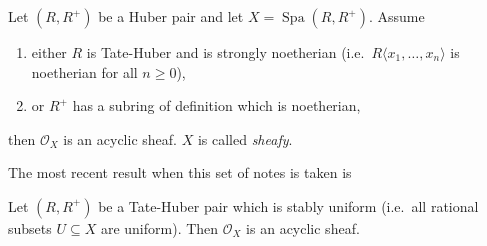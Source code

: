 \documentclass[a4paper]{article}
\newcommand{\sh}[1]{\mathcal{#1}} %
\DeclareMathOperator{\Spa}{Spa}
\begin{document}
\begin{theorem}
  Let \((R, R^+)\) be a Huber pair and let \(X = \Spa(R, R^+)\). Assume
  \begin{enumerate}
  \item either \(R\) is Tate-Huber and is strongly noetherian (i.e.\ \(R\langle x_1, \dots, x_n \rangle\) is noetherian for all \(n \geq 0\)),
  \item or \(R^+\) has a subring of definition which is noetherian,
  \end{enumerate}
  then \(\sh O_X\) is an acyclic sheaf. \(X\) is called \emph{sheafy}.
\end{theorem}

The most recent result when this set of notes is taken is

\begin{theorem}
  Let \((R, R^+)\) be a Tate-Huber pair which is stably uniform (i.e.\ all rational subsets \(U \subseteq X\) are uniform). Then \(\sh O_X\) is an acyclic sheaf.
\end{theorem}








\printindex
\end{document}
